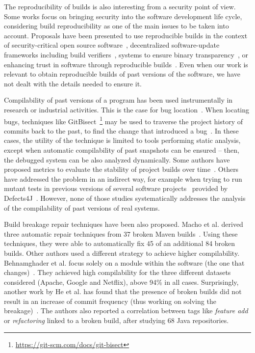 The reproducibility of builds is also interesting from a security point of view.
Some works focus on bringing security into the software development life cycle, considering build reproducibility as one of the main issues to be taken into account. Proposals have been presented to use reproducible builds in the context of security-critical open source software~\cite{deCarnedeCarnavalet:2014:CIV:2664243.2664288}, decentralized software-update frameworks including build verifiers~\cite{nikitin2017chainiac}, systems to ensure binary transparency~\cite{hassan2017automatic}, or enhancing trust in software through reproducible builds~\cite{Skrimstad:Thesis:2018}.
Even when our work is relevant to obtain reproducible builds of past versions of the software, we have not dealt with the details needed to ensure it.

Compilability of past versions of a program has been used instrumentally in research or industrial activities.
This is the case for bug location~\cite{Sliwerski:2005:CIF:1083142.1083147,Asaduzzaman:2012:BIC:2664446.2664463,Murgia:2010:MLA:1852786.1852794,Zimmermann:2006:MVA:1137983.1138001,Zimmermann2008}.
When locating bugs, techniques like GitBisect~\footnote{\url{https://git-scm.com/docs/git-bisect}} may be used to traverse the project history of commits back to the past, to find the change that introduced a bug~\cite{spinellis2012git,meneely2013patch}. 
In these cases, the utility of the technique is limited to tools performing static analysis, except when automatic compilability of past snapshots can be ensured -- then, the debugged system can be also analyzed dynamically.
Some authors have proposed metrics to evaluate the stability of project builds over time~\cite{6405296}.
Others have addressed the problem in an indirect way, for example when trying to run mutant tests in previous versions of several software projects~\cite{Just:2014:MVS:2635868.2635929} provided by Defects4J~\cite{Just:2014:DDE:2610384.2628055}. However, none of those studies systematically addresses the analysis of the compilability of past versions of real systems.

Build breakage repair techniques have been also proposed. Macho et al. derived three automatic repair techniques from 37 broken Maven builds~\cite{macho2018automatically}. 
Using these techniques, they were able to automatically fix 45 of an additional 84 broken builds. 
Other authors used a different strategy to achieve higher compilability. Behnamghader et al. focus solely on a module within the software (the one that changes)~\cite{behnamghader2018scalable}. They achieved high compilability for the three different datasets considered (Apache, Google and Netflix), above 94\% in all cases. Surprisingly, another work by He et al. has found that the presence of broken builds did not result in an increase of commit frequency (thus working on solving the breakage)~\cite{he2020characteristics}. The authors also reported a correlation between tags like \textit{feature add} or \textit{refactoring} linked to a broken build, after studying 68 Java repositories.

